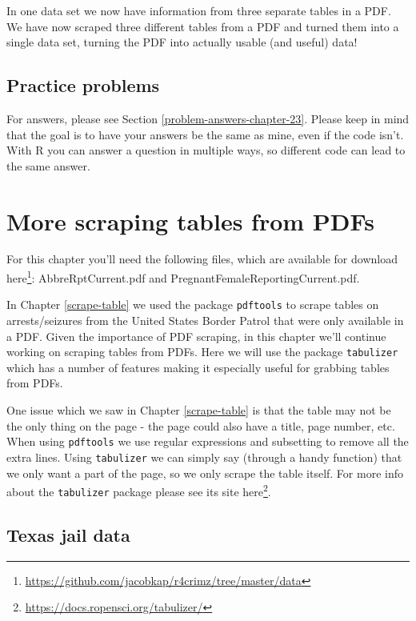 \documentclass[
]{krantz}
\renewcommand{\href}[2]{#2\footnote{\url{#1}}}
\begin{document}
In one data set we now have information from three separate tables in a PDF. We have now scraped three different tables from a PDF and turned them into a single data set, turning the PDF into actually usable (and useful) data!

\hypertarget{practice-problems-16}{%
\section{Practice problems}\label{practice-problems-16}}

For answers, please see Section \ref{problem-answers-chapter-23}. Please keep in mind that the goal is to have your answers be the same as mine, even if the code isn't. With R you can answer a question in multiple ways, so different code can lead to the same answer.

\hypertarget{scrape-table2}{%
\chapter{More scraping tables from PDFs}\label{scrape-table2}}

For this chapter you'll need the following files, which are available for download \href{https://github.com/jacobkap/r4crimz/tree/master/data}{here}: AbbreRptCurrent.pdf and PregnantFemaleReportingCurrent.pdf.

In Chapter \ref{scrape-table} we used the package \texttt{pdftools} to scrape tables on arrests/seizures from the United States Border Patrol that were only available in a PDF. Given the importance of PDF scraping, in this chapter we'll continue working on scraping tables from PDFs. Here we will use the package \texttt{tabulizer} which has a number of features making it especially useful for grabbing tables from PDFs.

One issue which we saw in Chapter \ref{scrape-table} is that the table may not be the only thing on the page - the page could also have a title, page number, etc. When using \texttt{pdftools} we use regular expressions and subsetting to remove all the extra lines. Using \texttt{tabulizer} we can simply say (through a handy function) that we only want a part of the page, so we only scrape the table itself. For more info about the \texttt{tabulizer} package please see its site \href{https://docs.ropensci.org/tabulizer/}{here}.

\hypertarget{texas-jail-data}{%
\section{Texas jail data}\label{texas-jail-data}}
\end{document}
